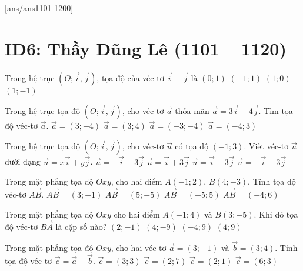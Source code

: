 [ans/ans1101-1200]
\setcounter{ex}{1100}
\section*{ID6: Thầy Dũng Lê (1101 -- 1120)}
\begin{ex}%
	Trong hệ trục $(O; \vec{i}, \vec{j})$, tọa độ của véc-tơ $\vec{i} -\vec{j}$ là
	\choice
	{$(0;1)$}
	{$(-1;1)$}
	{$(1;0)$}
	{\True $(1;-1)$}
\end{ex}

\begin{ex}%
	Trong hệ trục tọa độ $(O; \vec{i}, \vec{j})$, cho véc-tơ $\vec{a}$ thỏa mãn $\vec{a}=3\vec{i}-4\vec{j}$. Tìm tọa độ véc-tơ $\vec{a}$.
	\choice
	{\True $\vec{a}=(3;-4)$}
	{$\vec{a}=(3;4)$}
	{$\vec{a}=(-3;-4)$}
	{$\vec{a}=(-4;3)$}
\end{ex}

\begin{ex}%
	Trong hệ trục tọa độ $(O; \vec{i}, \vec{j})$, cho véc-tơ $\vec{u}$ có tọa độ $(-1;3)$. Viết véc-tơ $\vec{u}$ dưới dạng $\vec{u}=x\vec{i}+y\vec{j}$.
	\choice
	{\True $\vec{u}=-\vec{i}+3\vec{j}$}
	{$\vec{u}=\vec{i}+3\vec{j}$}
	{$\vec{u}=\vec{i}-3\vec{j}$}
	{$\vec{u}=-\vec{i}-3\vec{j}$}
\end{ex}

\begin{ex}%
	Trong mặt phẳng tọa độ $Oxy$, cho hai điểm $A(-1;2)$, $B(4;-3)$. Tính tọa độ véc-tơ $\vec{AB}$.
	\choice
	{$\vec{AB}=(3;-1)$}
	{\True $\vec{AB}=(5;-5)$}
	{$\vec{AB}=(-5;5)$}
	{$\vec{AB}=(-4;6)$}
\end{ex}

\begin{ex}%
	Trong mặt phẳng tọa độ $Oxy$ cho hai điểm $A(-1;4)$ và $B(3;-5)$. Khi đó tọa độ véc-tơ $\vec{BA}$ là cặp số nào?
	\choice
	{$(2;-1)$}
	{$(4;-9)$}
	{\True $(-4;9)$}
	{$(4;9)$}
\end{ex}

\begin{ex}%
	Trong mặt phẳng tọa độ $Oxy$, cho hai véc-tơ $\vec{a}=(3;-1)$ và $\vec{b}=(3;4)$. Tính tọa độ véc-tơ $\vec{c}=\vec{a}+\vec{b}$.
	\choice
	{$\vec{c}=(3;3)$}
	{$\vec{c}=(2;7)$}
	{$\vec{c}=(2;1)$}
	{\True $\vec{c}=(6;3)$}
\end{ex}

